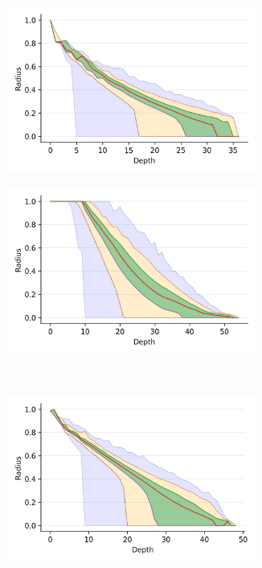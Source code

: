 \documentclass{article}
\begin{document}
\begin{figure}
    \captionsetup[subfigure]{aboveskip=-15pt,belowskip=-3pt}
    \begin{subfigure}[b]{0.47\textwidth}
        \includegraphics[width=0.9\textwidth]{images/radius/fashion-mnist.png}\\
        \label{fig:supplement:fashion-mnist-radius}
    \end{subfigure}%
    \begin{subfigure}[b]{0.47\textwidth}
        \includegraphics[width=0.9\textwidth]{images/radius/glove-25.png}\\
        \label{fig:supplement:glove-25-radius}
    \end{subfigure}
    \\
    \begin{subfigure}[b]{0.47\textwidth}
        \includegraphics[width=0.9\textwidth]{images/radius/sift.png}\\

\end{subfigure}
\end{figure}
\end{document}
